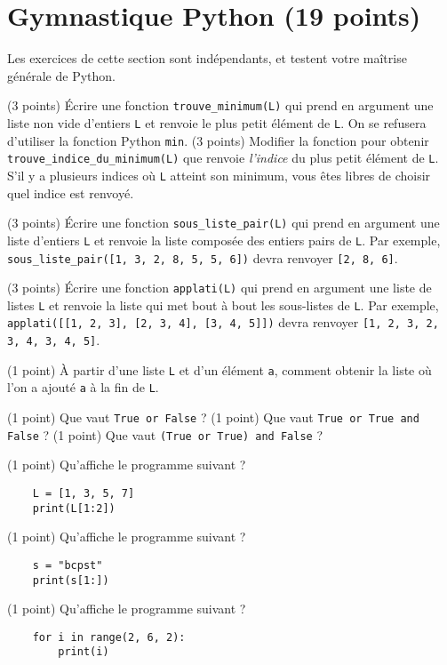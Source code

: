 \section*{Gymnastique Python (19 points)}

Les exercices de cette section sont indépendants, et testent votre maîtrise générale de Python.

\quessques (3 points) Écrire une fonction \texttt{trouve_minimum(L)} qui prend en argument une liste non vide d'entiers \texttt{L} et renvoie le plus petit élément de \texttt{L}. On se refusera d'utiliser la fonction Python \texttt{min}.
\ssques (3 points) Modifier la fonction pour obtenir \texttt{trouve_indice_du_minimum(L)} que renvoie \textit{l'indice} du plus petit élément de \texttt{L}. S'il y a plusieurs indices où \texttt{L} atteint son minimum, vous êtes libres de choisir quel indice est renvoyé.

\ques (3 points) Écrire une fonction \texttt{sous_liste_pair(L)} qui prend en argument une liste d'entiers \texttt{L} et renvoie la liste composée des entiers pairs de \texttt{L}. Par exemple, \texttt{sous_liste_pair([1, 3, 2, 8, 5, 5, 6])} devra renvoyer \texttt{[2, 8, 6]}.

\ques (3 points) Écrire une fonction \texttt{applati(L)} qui prend en argument une liste de listes \texttt{L} et renvoie la liste qui met bout à bout les sous-listes de \texttt{L}. Par exemple, \texttt{applati([[1, 2, 3], [2, 3, 4], [3, 4, 5]])} devra renvoyer \texttt{[1, 2, 3, 2, 3, 4, 3, 4, 5]}.

\ques (1 point) À partir d'une liste \texttt{L} et d'un élément \texttt{a}, comment obtenir la liste où l'on a ajouté \texttt{a} à la fin de \texttt{L}.

\quessques (1 point) Que vaut \texttt{True or False} ?
\ssques (1 point) Que vaut \texttt{True or True and False} ?
\ssques (1 point) Que vaut \texttt{(True or True) and False} ?

\quessques (1 point) Qu'affiche le programme suivant ?

\begin{verbatim}
    L = [1, 3, 5, 7]
    print(L[1:2])
\end{verbatim}

\ssques (1 point) Qu'affiche le programme suivant ? 

\begin{verbatim}
    s = "bcpst"
    print(s[1:])
\end{verbatim}

\ssques (1 point) Qu'affiche le programme suivant ? 

\begin{verbatim}
    for i in range(2, 6, 2):
        print(i)
\end{verbatim}
